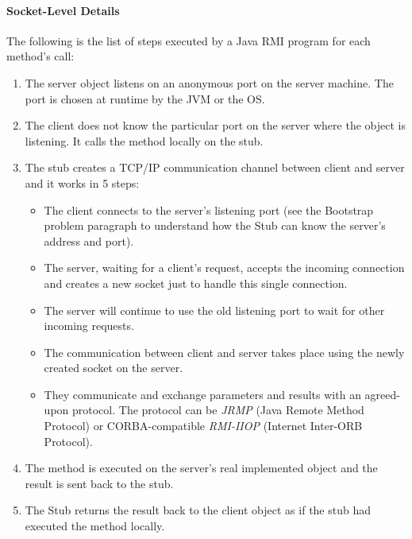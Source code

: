 \paragraph{Socket-Level Details}
\label{SocketLevelDetails}

The following is the list of steps executed by a Java RMI program for each method's call:
\begin{enumerate}
\item The server object listens on an anonymous port on the server machine. The port is chosen at runtime by the JVM or the OS.
\item The client does not know the particular port on the server where the object is listening. It calls the method locally on the stub.
\item The stub creates a TCP/IP communication channel between client and server and it works in 5 steps: 
	\begin{itemize}
	\item The client connects to the server's listening port (see the Bootstrap problem paragraph to understand how the          Stub can know the server's address and port).
  \item The server, waiting for a client's request, accepts the incoming connection and creates a new socket just to 				  handle this single connection.
  \item The server will continue to use the old listening port to wait for other incoming requests.
  \item The communication between client and server takes place using the newly created socket on the server.
  \item They communicate and exchange parameters and results with an agreed-upon protocol. The protocol can be                 \textit{JRMP} (Java Remote Method Protocol) or CORBA-compatible \textit{RMI-IIOP} (Internet Inter-ORB                  Protocol).
	\end{itemize}
\item The method is executed on the server's real implemented object and the result is sent back to the stub.
\item The Stub returns the result back to the client object as if the stub had executed the method locally.
\end{enumerate}

